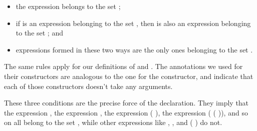 \documentclass[12pt]{report}
\begin{document}
\begin{itemize}
\item  the expression  belongs to the set ; 

\item  if  is an expression belonging to the set , then  
      is also an expression belonging to the set ; and

\item  expressions formed in these two ways are the only ones belonging
      to the set .

\end{itemize}
    The same rules apply for our definitions of  and . The
    annotations we used for their constructors are analogous to the
    one for the  constructor, and indicate that each of those
    constructors doesn't take any arguments. 

 These three conditions are the precise force of the
     declaration.  They imply that the expression , the
    expression  , the expression  ( ), the expression
     ( ( )), and so on all belong to the set , while other
    expressions like ,   , and  ( ) do
    not.
\end{document}
